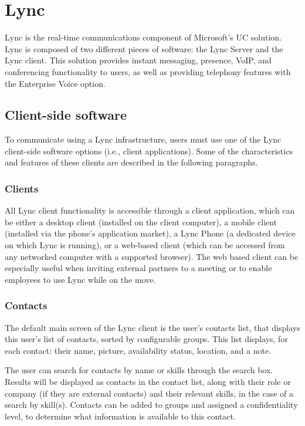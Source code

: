 \section{Lync}

Lync is the real-time communications component of Microsoft's UC solution. Lync is composed of two different pieces of software: the Lync Server and the Lync client. This solution provides instant messaging, presence, VoIP, and conferencing functionality to users, as well as providing telephony features with the Enterprise Voice option\cite{winters_mastering_2012}.

\subsection{Client-side software}

To communicate using a Lync infrastructure, users must use one of the Lync client-side software options (i.e., client applications). Some of the characteristics and features of these clients are described in the following paragraphs.

\subsubsection{Clients}
All Lync client functionality is accessible through a client application, which can be either a desktop client (installed on the client computer), a mobile client (installed via the phone's application market), a Lync Phone (a dedicated device on which Lync is running), or a web-based client (which can be accessed from any networked computer with a supported browser\cite{microsoft_technet_lync_2013-1}). The web based client can be especially useful when inviting external partners to a meeting or to enable employees to use Lync while on the move\cite[Ch. 1.1]{winters_mastering_2012}.

\subsubsection{Contacts}
The default main screen of the Lync client is the user's contacts list, that displays this user's list of contacts, sorted by configurable groups. This list displays, for each contact: their name, picture, availability status, location, and a note.

The user can search for contacts by name or skills through the search box. Results will be displayed as contacts in the contact list, along with their role or company (if they are external contacts) and their relevant skills, in the case of a search by skill(s). Contacts can be added to groups and assigned a confidentiality level, to determine what information is available to this contact.

